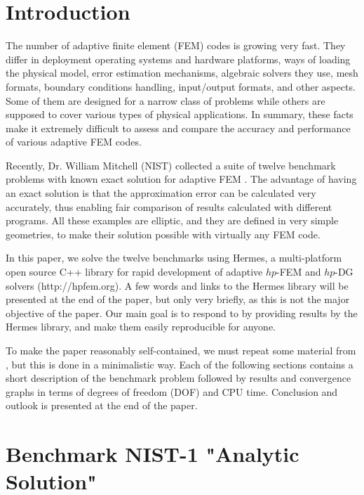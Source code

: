 \documentclass[12pt]{elsarticle}
\begin{document}
\section{Introduction}
\label{sec:intro}

The number of adaptive finite element (FEM) codes is growing very fast.
They differ in deployment operating systems and hardware platforms,
ways of loading the physical model, error estimation mechanisms,
algebraic solvers they use, mesh formats, boundary conditions
handling, input/output formats, and other aspects. Some of them are
designed for a narrow class of problems while others are supposed to
cover various types of physical applications. In summary, these facts
make it extremely difficult to assess and compare the accuracy and
performance of various adaptive FEM codes.

Recently, Dr. William Mitchell (NIST) collected a suite of
twelve benchmark problems with known exact solution for adaptive
FEM \cite{mitchell-1}. The advantage of having an exact solution is that
the approximation error can be calculated very accurately, thus
enabling fair comparison of results calculated with different
programs. All these examples are elliptic, and they are defined
in very simple geometries, to make their solution possible with
virtually any FEM code.

In this paper, we solve the twelve benchmarks using
Hermes, a multi-platform open source C++
library for rapid development of adaptive $hp$-FEM
and $hp$-DG solvers (http://hpfem.org). A few words
and links to the Hermes library will be presented at the
end of the paper, but only very briefly, as this is not
the major objective of the paper. Our main goal is to
respond to \cite{mitchell-1} by providing results by
the Hermes library, and make them easily reproducible
for anyone.

To make the paper reasonably self-contained, we must repeat some
material from \cite{mitchell-1}, but this is done in a minimalistic way.
Each of the following sections contains a short description of
the benchmark problem followed by results and convergence graphs in terms of degrees
of freedom (DOF) and CPU time. Conclusion and outlook
is presented at the end of the paper.


\section{Benchmark NIST-1 "Analytic Solution"}
\label{sec:bench-1}
\end{document}
